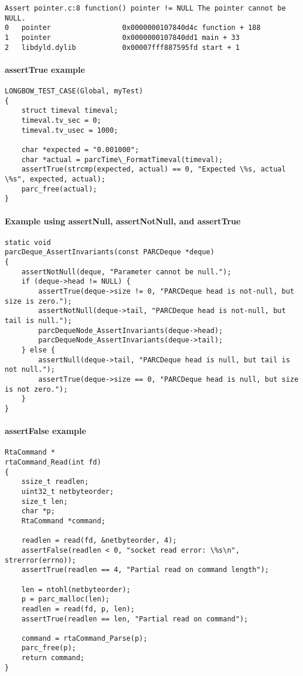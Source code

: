 \begin{lstlisting}
Assert pointer.c:8 function() pointer != NULL The pointer cannot be NULL.
0   pointer                 0x0000000107840d4c function + 188
1   pointer                 0x0000000107840dd1 main + 33
2   libdyld.dylib           0x00007fff887595fd start + 1

\end{lstlisting}

\paragraph {assertTrue example}

\begin{lstlisting}
LONGBOW_TEST_CASE(Global, myTest)
{
    struct timeval timeval;
    timeval.tv_sec = 0;
    timeval.tv_usec = 1000;
    
    char *expected = "0.001000";
    char *actual = parcTime\_FormatTimeval(timeval);
    assertTrue(strcmp(expected, actual) == 0, "Expected \%s, actual \%s", expected, actual);
    parc_free(actual);
}
 \end{lstlisting}
 
\paragraph{Example using assertNull, assertNotNull, and assertTrue}
 
\begin{lstlisting}
static void
parcDeque_AssertInvariants(const PARCDeque *deque)
{
    assertNotNull(deque, "Parameter cannot be null.");
    if (deque->head != NULL) {
        assertTrue(deque->size != 0, "PARCDeque head is not-null, but size is zero.");
        assertNotNull(deque->tail, "PARCDeque head is not-null, but tail is null.");
        parcDequeNode_AssertInvariants(deque->head);
        parcDequeNode_AssertInvariants(deque->tail);
    } else {
        assertNull(deque->tail, "PARCDeque head is null, but tail is not null.");
        assertTrue(deque->size == 0, "PARCDeque head is null, but size is not zero.");
    }
}

\end{lstlisting}

\paragraph {assertFalse example}
\begin{lstlisting}
RtaCommand *
rtaCommand_Read(int fd)
{
    ssize_t readlen;
    uint32_t netbyteorder;
    size_t len;
    char *p;
    RtaCommand *command;

    readlen = read(fd, &netbyteorder, 4);
    assertFalse(readlen < 0, "socket read error: \%s\n", strerror(errno));
    assertTrue(readlen == 4, "Partial read on command length");

    len = ntohl(netbyteorder);
    p = parc_malloc(len);
    readlen = read(fd, p, len);
    assertTrue(readlen == len, "Partial read on command");

    command = rtaCommand_Parse(p);
    parc_free(p);
    return command;
}
\end{lstlisting}


